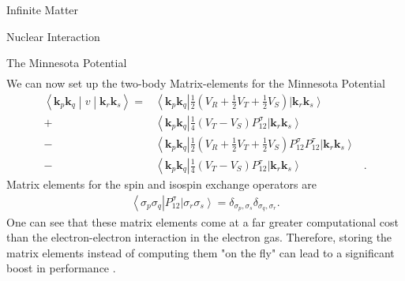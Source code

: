 \documentclass[twoside,english]{uiofysmaster}
\begin{document}
\begin{chapter}{Infinite Matter}
\begin{section}{Nuclear Interaction}
\begin{subsection}{The Minnesota Potential}
\begin{align}
			\end{align}
			We can now set up the two-body Matrix-elements for the Minnesota Potential
			\begin{align}
				\left<\mathbf{k}_p \mathbf{k}_q \middle| v \middle| \mathbf{k}_r \mathbf{k}_s \right> = 
				&\left<\mathbf{k}_p \mathbf{k}_q \right| \frac{1}{2} \left( V_R + \frac{1}{2} V_T + \frac{1}{2} V_S \right) \left| \mathbf{k}_r \mathbf{k}_s \right>   \\
				+&\left<\mathbf{k}_p \mathbf{k}_q \right| \frac{1}{4} (V_T - V_S) P_{12}^\sigma \left| \mathbf{k}_r \mathbf{k}_s \right> \nonumber \\
				-&\left<\mathbf{k}_p \mathbf{k}_q \right| \frac{1}{2} \left( V_R + \frac{1}{2} V_T + \frac{1}{2} V_S \right) P_{12}^\sigma P_{12}^\tau \left| \mathbf{k}_r \mathbf{k}_s \right> \nonumber \\
				-&\left<\mathbf{k}_p \mathbf{k}_q \right| \frac{1}{4}(V_T - V_S) P_{12}^\tau  \left| \mathbf{k}_r \mathbf{k}_s \right>&. \nonumber
			\end{align}
			Matrix elements for the spin and isospin exchange operators are 
			\begin{align}
				\left< \sigma_p \sigma_q \right| P_{12}^\sigma \left| \sigma_r \sigma_s \right> = \delta_{\sigma_p,\sigma_s} \delta_{\sigma_q,\sigma_r}.
			\end{align}
			One can see that these matrix elements come at
                        a far greater computational cost than the
                        electron-electron interaction in the electron
                        gas. Therefore, storing the matrix elements instead of computing them
                        "on the fly" can lead to a significant boost in performance \cite{MHJonline}.
		\end{subsection}
		
	\end{section}

\end{chapter}
\end{document}
